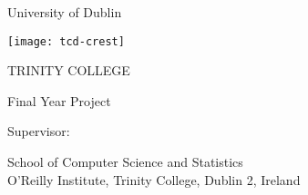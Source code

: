 \thispagestyle{empty}
\begin{center}

{\sffamily
{\Large University of Dublin}

\vspace{10pt}

\texttt{[image: tcd-crest]}

\vspace{10pt}

{\Huge TRINITY COLLEGE}

\vspace{80pt}

\textbf{ \LARGE \emph \projecttitle}

\vspace{30pt}

\authorname

\degreetitle

Final Year Project \shortsubmissiondate

Supervisor: \supervisorname

\vspace{110pt}

\large{
    School of Computer Science and Statistics\\
    \vspace{5mm}
    O'Reilly Institute, Trinity College, Dublin 2, Ireland
}
\linespread{1}
}

\end{center}